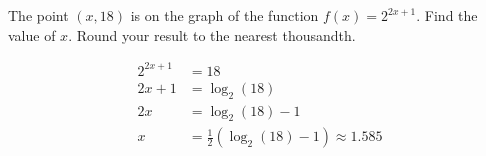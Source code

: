 






The point $(x, 18)$ is on the graph of the function $f(x)=2^{2x+1}$. Find the value of $x$.  Round your result to the nearest thousandth.

\begin{solution}
\[
\begin{split}
2^{2x+1}&=18\\
2x+1&=\log_2(18)\\
2x&=\log_2(18)-1\\
x&=\frac{1}{2}(\log_2(18)-1)\approx1.585
\end{split}
\]
\end{solution}
